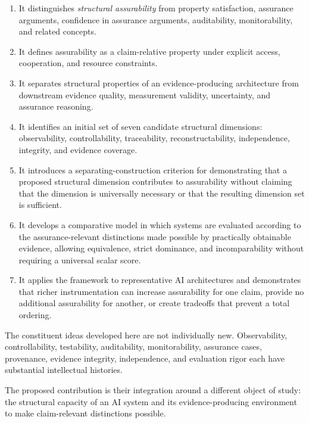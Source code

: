 \begin{enumerate}


  \item It distinguishes \emph{structural assurability} from property satisfaction,
        assurance arguments, confidence in assurance arguments, auditability, monitorability, and related concepts.

  \item It defines assurability as a claim-relative property under explicit access, cooperation, and resource constraints.

  \item It separates structural properties of an evidence-producing architecture from downstream
        evidence quality, measurement validity, uncertainty, and assurance reasoning.

  \item It identifies an initial set of seven candidate structural dimensions:
        observability, controllability, traceability, reconstructability, independence, integrity, and evidence coverage.

  \item It introduces a separating-construction criterion for demonstrating that a proposed structural dimension
        contributes to assurability without claiming that the dimension is universally necessary or that the resulting dimension set is sufficient.

  \item It develops a comparative model in which systems are evaluated according to the assurance-relevant distinctions
        made possible by practically obtainable evidence, allowing equivalence, strict dominance, and incomparability without requiring a universal scalar score.

  \item It applies the framework to representative AI architectures and demonstrates that richer instrumentation
        can increase assurability for one claim, provide no additional assurability for another, or create tradeoffs that prevent a total ordering.


\end{enumerate}

The constituent ideas developed here are not individually new.
Observability, controllability, testability, auditability, monitorability, assurance cases,
provenance, evidence integrity, independence, and evaluation rigor each have substantial intellectual histories.

The proposed contribution is their integration around a different object of study:
the structural capacity of an AI system and its evidence-producing environment to make claim-relevant distinctions possible.

